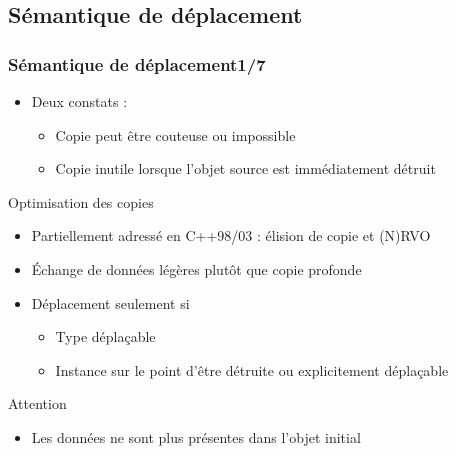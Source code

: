 \documentclass[C++.tex]{subfiles}
\begin{document}
\subsection*{Sémantique de déplacement}
\begin{frame}
	\frametitle{Sémantique de déplacement\titlehfill{}1/7}
	\begin{itemize}
		\item Deux constats :
		\begin{itemize}
			\item Copie peut être couteuse ou impossible


			\item Copie inutile lorsque l'objet source est immédiatement détruit
		\end{itemize}
	\end{itemize}

	\begin{block}{Optimisation des copies}
		\begin{itemize}
			\item Partiellement adressé en C++98/03 : élision de copie et (N)RVO
		\end{itemize}

	\end{block}

	\begin{itemize}
		\item Échange de données légères plutôt que copie profonde
		\item Déplacement seulement si
		\begin{itemize}
			\item Type déplaçable
			\item Instance sur le point d'être détruite ou explicitement déplaçable
		\end{itemize}
	\end{itemize}

	\begin{alertblock}{Attention}
		\begin{itemize}
			\item Les données ne sont plus présentes dans l'objet initial
		\end{itemize}
	\end{alertblock}
\end{frame}
\end{document}
